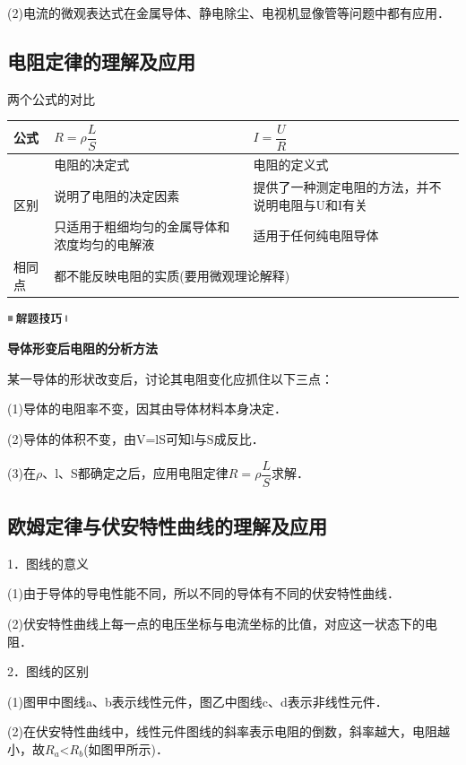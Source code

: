 \documentclass[cn,10.5pt,chinese,mac,chinesefont=founder]{elegantbook}
\begin{document}
(2)电流的微观表达式在金属导体、静电除尘、电视机显像管等问题中都有应用．

\subsection{电阻定律的理解及应用}

两个公式的对比

\begin{longtable}[]{@{}m{1.2cm}m{6cm}m{6cm}@{}}
\toprule
公式 & $R=\rho \dfrac{L}{S}$ & $I=\dfrac{U}{R}$\tabularnewline
\midrule
\endhead
\multirow{3}{1cm}{区别} & 电阻的决定式 & 电阻的定义式\tabularnewline
& 说明了电阻的决定因素 &
提供了一种测定电阻的方法，并不说明电阻与U和I有关\tabularnewline
& 只适用于粗细均匀的金属导体和浓度均匀的电解液 &
适用于任何纯电阻导体\tabularnewline
相同点 &\multicolumn{2}{l}{ 都不能反映电阻的实质(要用微观理论解释) }\tabularnewline
\bottomrule
\end{longtable}

\begin{center}\includegraphics[width=0.70764in,height=0.12292in]{media/image37.png}\end{center}
\begin{center}
	\textbf{导体形变后电阻的分析方法}
\end{center}

某一导体的形状改变后，讨论其电阻变化应抓住以下三点：

(1)导体的电阻率不变，因其由导体材料本身决定．

(2)导体的体积不变，由V=lS可知l与S成反比．

(3)在$\rho$、l、S都确定之后，应用电阻定律$R=\rho \dfrac{L}{S}$求解．
\newpage
\subsection{欧姆定律与伏安特性曲线的理解及应用}


1．图线的意义

(1)由于导体的导电性能不同，所以不同的导体有不同的伏安特性曲线．

(2)伏安特性曲线上每一点的电压坐标与电流坐标的比值，对应这一状态下的电阻．

2．图线的区别

(1)图甲中图线a、b表示线性元件，图乙中图线c、d表示非线性元件．

(2)在伏安特性曲线中，线性元件图线的斜率表示电阻的倒数，斜率越大，电阻越小，故$R_a$\textless $R_b$(如图甲所示)．
\end{document}
